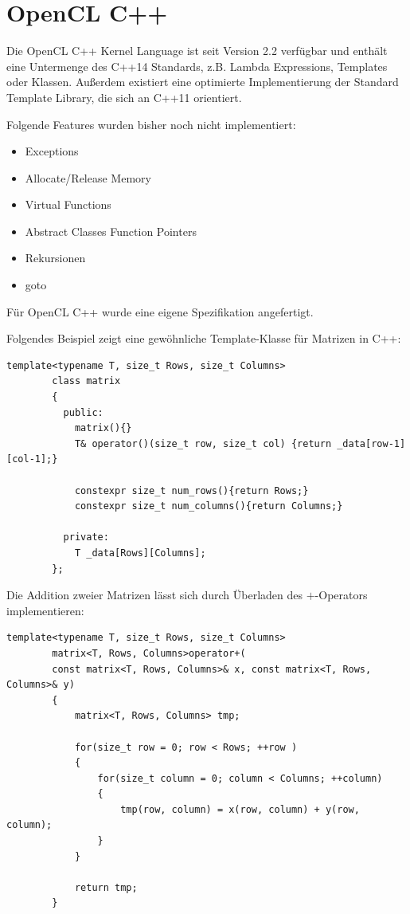 	    \section{OpenCL C++}\label{OCLC++}
	    Die OpenCL C++ \Gls{Kernel} Language ist seit Version 2.2 verfügbar und enthält eine Untermenge des C++14 Standards, z.B. Lambda Expressions, Templates oder Klassen. Außerdem existiert eine optimierte Implementierung der Standard Template Library, die sich an C++11 orientiert. 
		
	    Folgende Features wurden bisher noch nicht implementiert:
	    \begin{itemize}
		    \item Exceptions
		    \item Allocate/Release Memory
		    \item Virtual Functions 
		    \item Abstract Classes Function Pointers
		    \item Rekursionen 
        	    \item goto
	    \end{itemize}
		
	    Für OpenCL C++ wurde eine eigene Spezifikation angefertigt. \autocite{oclC++Spec}
		
        Folgendes Beispiel zeigt eine gewöhnliche Template-Klasse für Matrizen in C++:
        \begin{lstlisting}[caption=Matrix OpenCl C++]
        template<typename T, size_t Rows, size_t Columns>
        class matrix 
        {
          public:
            matrix(){}
            T& operator()(size_t row, size_t col) {return _data[row-1][col-1];}

            constexpr size_t num_rows(){return Rows;}
            constexpr size_t num_columns(){return Columns;}
			
          private:
            T _data[Rows][Columns];
        };
        \end{lstlisting}
		
	    Die Addition zweier Matrizen lässt sich durch Überladen des $+$-Operators implementieren:
	    \begin{lstlisting}[caption=Matrixaddition OpenCl C++]
        template<typename T, size_t Rows, size_t Columns> 
        matrix<T, Rows, Columns>operator+(
        const matrix<T, Rows, Columns>& x, const matrix<T, Rows, Columns>& y) 
        {
            matrix<T, Rows, Columns> tmp;
			
            for(size_t row = 0; row < Rows; ++row ) 
            {
                for(size_t column = 0; column < Columns; ++column) 
                {
                    tmp(row, column) = x(row, column) + y(row, column);
                }
            }
            
            return tmp;
        }
        \end{lstlisting}
		
